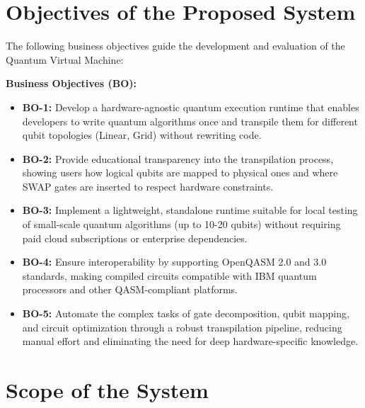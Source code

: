 
\section{Objectives of the Proposed System}

The following business objectives guide the development and evaluation of the Quantum Virtual Machine:

\vspace{0.3cm}

\textbf{Business Objectives (BO):}

\begin{itemize}
    \item \textbf{BO-1:} Develop a hardware-agnostic quantum execution runtime that enables developers to write quantum algorithms once and transpile them for different qubit topologies (Linear, Grid) without rewriting code.
    
    \item \textbf{BO-2:} Provide educational transparency into the transpilation process, showing users how logical qubits are mapped to physical ones and where SWAP gates are inserted to respect hardware constraints.
    
    \item \textbf{BO-3:} Implement a lightweight, standalone runtime suitable for local testing of small-scale quantum algorithms (up to 10-20 qubits) without requiring paid cloud subscriptions or enterprise dependencies.
    
    \item \textbf{BO-4:} Ensure interoperability by supporting OpenQASM 2.0 and 3.0 standards, making compiled circuits compatible with IBM quantum processors and other QASM-compliant platforms.
    
    \item \textbf{BO-5:} Automate the complex tasks of gate decomposition, qubit mapping, and circuit optimization through a robust transpilation pipeline, reducing manual effort and eliminating the need for deep hardware-specific knowledge.
\end{itemize}




\section{Scope of the System}

